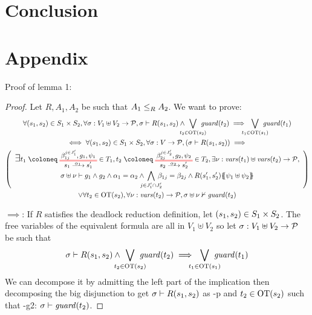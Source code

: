 \documentclass{article}
\begin{document}
\section{Conclusion}


\section{Appendix}
Proof of lemma 1:
\begin{proof} %
Let \(R, A_1, A_2\) be such that \(\wrel{A_1}{A_2}{R}\).
We want to prove:
\begin{gather*}
	\forall \mpar{s_1, s_2} \in S_1 \times S_2, \forall \sigma: V_1 \uplus V_2 \to \values, \sigma \vdash R\mpar{s_1, s_2} \wedge \bigvee_\subbox{t_2 \in \fOT{s_2}} \fguard{t_2} \implies \bigvee_\subbox{t_1 \in \fOT{s_1}} \fguard{t_1} \\
\iff
	\forall \mpar{s_1, s_2} \in S_1 \times S_2, \forall \sigma: V \to \values, \mpar{\sigma \vdash R\mpar{s_1, s_2}} \implies \\
	\mpar{\everymath{\displaystyle}\begin{array}{c}
		\bigsymb{\exists} t_1 \defobject \OTx{1}{}{1}{1} \in T_1, t_2 \defobject \OTx{2}{}{2}{2} \in T_2, \exists \nu: \fvars{t_1} \uplus \fvars{t_2} \to \values, \\
		\sigma \uplus \nu \vdash g_1 \wedge g_2 \wedge \alpha_1 = \alpha_2 \wedge \bigwedge_\subbox{j \in J'_1 \cap J'_2} \beta_{1j} = \beta_{2j} \wedge R\mpar{s'_1, s'_2}\psubst{\psi_1 \uplus \psi_2}
	\end{array}} \\
	\vee \forall t_2 \in \fOT{s_2}, \forall \nu: \fvars{t_2} \to \values, \sigma \uplus \nu \nvdash \fguard{t_2}
\end{gather*}
\item[\(\implies\):] If \(R\) satisfies the deadlock reduction definition, let \(\mpar{s_1, s_2} \in S_1 \times S_2\).
	The free variables of the equivalent formula are all in \(V_1 \uplus V_2\) so let \(\sigma: V_1 \uplus V_2 \to \values\) be such that
	\[ \sigma \vdash R\mpar{s_1, s_2} \wedge \bigvee_\subbox{t_2 \in \fOT{s_2}} \fguard{t_2} \implies \bigvee_\subbox{t_1 \in \fOT{s_1}} \fguard{t_1} \]
	We can decompose it by admitting the left part of the implication then decomposing the big disjunction to get \(\sigma \vdash R\mpar{s_1, s_2}\) as \hyp{p} and \(t_2 \in \fOT{s_2}\) such that \hyp{g2}: \(\sigma \vdash \fguard{t_2}\).

\end{proof}
\end{document}
